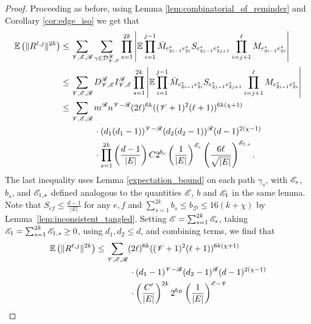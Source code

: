 \begin{proof}
Proceeding as before, using Lemma \ref{lem:combinatorial_of_reminder} and Corollary \ref{cor:edge_iso} we get that
\begin{align*}
    \mathbb{E}\left(\|R^{\ell,j}\|^{2k}\right)
    &\leq
    \sum_{\mathscr{V}, \mathscr{E}, \mathscr{R}}
    \sum_{\gamma \in \mathcal{D}_{\mathscr{V}, \mathscr{E}}^{\mathscr{R}} }
    \prod_{s=1}^{2k}
    \left|
    \mathbb{E}
    \prod_{i=1}^{j-1} \bar{M}_{e^s_{2i-1} e^s_{2i}} 
    S_{e^s_{2j-1} e^s_{2j+1}}
    \prod_{i=j+1}^{\ell} M_{e^s_{2i-1} e^s_{2i}}
    \right|  \\
    &\leq
    \sum_{\mathscr{V}, \mathscr{E}, \mathscr{R}}
    D_{\mathscr{V}, \mathscr{E}}^{\mathscr{R}} 
    I_{\mathscr{V}, \mathscr{E}}^{\mathscr{R}} 
    \prod_{s=1}^{2k}
    \left|
    \mathbb{E}
    \prod_{i=1}^{j-1} \bar{M}_{e^s_{2i-1} e^s_{2i}} 
    S_{e^s_{2j-1} e^s_{2j+1}}
    \prod_{i=j+1}^{\ell} M_{e^s_{2i-1} e^s_{2i}}
    \right| \\
    &\leq
    \sum_{\mathscr{V}, \mathscr{E}, \mathscr{R}}
    m^{\mathscr{R}} n^{\mathscr{V}-\mathscr{R}}
    (2 \ell)^{6k} 
    ( (\mathscr{V} + 1)^2 (\ell + 1) )^{6k(\chi + 1)} \\
    & \qquad \qquad \cdot
    (d_1 (d_1 - 1))^{\mathscr{V} - \mathscr{R}}
    (d_2 (d_2 - 1))^{\mathscr{R}}
    (d - 1)^{2 (\chi - 1)} \\
    & \qquad \qquad \cdot
    \prod_{s=1}^{2k}
    \left( \frac{d-1}{|E|} \right)
    C
    2^{b_s}
    \left(\frac{1}{|E|} \right)^{\mathscr{E}_s}
    \left( \frac{6\ell}{\sqrt{|E|}} \right)^{\mathscr{E}_{1,s}} .
\end{align*}
The last inequality uses Lemma \ref{expectation_bound} on each path $\gamma_s$, 
with  $\mathscr{E}_s$, $b_s$, and $\mathscr{E}_{1,s}$ 
defined analogous to the quantities $\mathscr{E}$, $b$ and $\mathscr{E}_1$ in the same lemma.
Note that $S_{ef} \leq \frac{d-1}{|E|}$ for any $e,f$ and 
$\sum_{s=1}^{2k} b_s \leq b_\mathcal{D} \leq 16 (k + \chi)$
by Lemma~\ref{lem:inconsistent_tangled}. 
Setting
$\mathscr{E} = \sum_{s=1}^{2k} \mathscr{E}_s$, 
taking
$\mathscr{E}_1 = \sum_{s=1}^{2k} \mathscr{E}_{1,s} \geq 0$,
using $d_1, d_2 \leq d$,
and combining terms, 
we find that
\begin{align*}
    \E\left(\|R^{\ell,j}\|^{2k}\right)
    & \leq
    \sum_{\nvertex, \nedge, \nvright}
    (2 \ell)^{6k} 
    ( (\nvertex + 1)^2 (\ell + 1) )^{6k(\chi + 1)} \\
    & \qquad \qquad \cdot
    (d_1 - 1)^{\nvertex - \nvright}
    (d_2 - 1)^\nvright
    (d - 1)^{2 (\chi - 1)} \\
    & \qquad \qquad \cdot
    \left( \frac{C'}{|E|} \right)^{2k}
    2^{b_\mathcal{D}}
    \left(\frac{1}{|E|} \right)^{\nedge - \nvertex} \\

\end{align*}
\end{proof}
